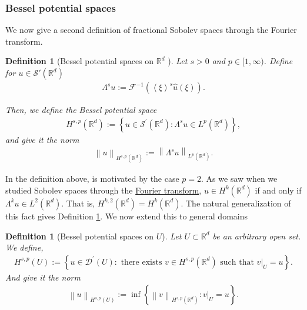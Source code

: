 \documentclass[
    a4paper,
    DIV=14,
    abstract=true,
    numbers=noenddot
]
{scrartcl}
\newtheorem{definition}[theorem]{Definition}
\theoremstyle{definition}
\newcommand{\wh}[1]{\widehat{#1}}
\newcommand{\br}[1]{\left\langle#1\right\rangle}
\newcommand{\set}[1]{\left\{#1\right\}}
\renewcommand{\norm}[1]{\left\lVert #1 \right\rVert}\renewcommand{\abs}[1]{\left| #1 \right|}
\newcommand\restr[2]{\left.#1\right|_{#2}}
\newcommand{\R}{\mathbb{R}}
\newcommand{\Ff}{\mathcal{F}}
\newcommand{\Ss}{\mathcal{S}}
\begin{document}
\subsubsection{Bessel potential spaces}
We now give a second definition of fractional Sobolev spaces through the Fourier transform.
\begin{definition}[Bessel potential spaces on $\R^d$ ]\label{bessel potential def}
	Let $s>0$ and $p \in [1,\infty)$. Define for $u \in \Ss'(\R^d)$
	\begin{align*}
		\Lambda^s u := \Ff^{-1}\left(\br{\xi}^s \wh{u}(\xi)\right).
	\end{align*}

	Then, we define the \emph{Bessel potential space}
	\begin{align*}
		H^{s,p}(\R^d):=\left\{u \in \mathcal{S}^{\prime}(\mathbb{R}^d): \Lambda ^s u \in L^p(\mathbb{R}^d)\right\},
	\end{align*}
	and give it the norm
	\begin{align*}
		\norm{u}_{H^{s,p}(\R^d)}:= \norm{\Lambda^s u}_{L^p(\R^d)}.
	\end{align*}
\end{definition}
In the definition above, is motivated by the case $p=2$. As we saw when we studied Sobolev spaces through the \href{https://nowheredifferentiable.com/2023-01-29-PDE-1-Fourier/#:~:text=Sobolev%20spaces-,Sobolev%20spaces,-form%20a%20particular}{Fourier transform}, $u \in H^k(\R^d)$ if and only if $\Lambda^k u \in L^2(\R^d)$. That is, $H^{k,2}(\R^d)=H^{k}(\R^d)$.  The natural generalization of this fact gives Definition \ref{bessel potential def}. We now extend this to general domains
\begin{definition}[Bessel potential spaces on $U$]
	Let $U \subset \R^d$ be an arbitrary open set. We define,
	\begin{align*}
		H^{s,p}(U):=\left\{u \in \mathcal{D}^{\prime}(U): \text{ there exists } v \in H^{s,p}(\R^d) \text{ such that } \restr{v}{U}=u\right\}.
	\end{align*}
	And give it the norm
	\begin{align*}
		\norm{u}_{H^{s,p}(U)}:= \inf \set{\norm{v}_{H^{s,p}(\R^d)}: \restr{v}{U}=u}.
	\end{align*}
\end{definition}
\end{document}
